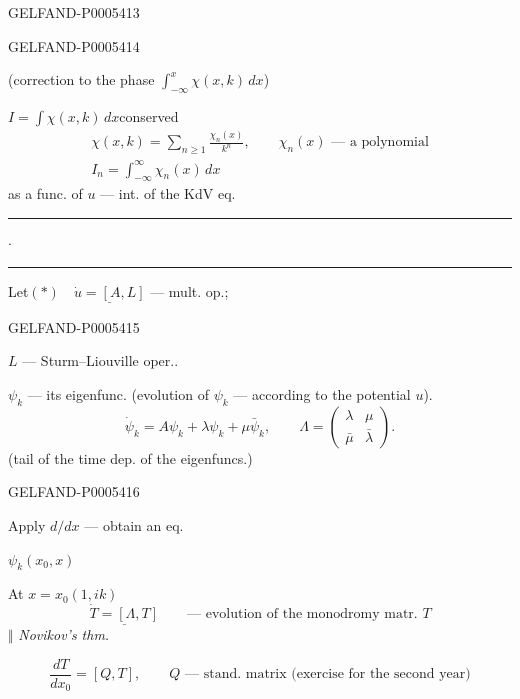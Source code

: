 \begin{GelfandAdjacentEvidence}{GELFAND-P000541}{3}

\end{GelfandAdjacentEvidence}
\begin{GelfandAdjacentEvidence}{GELFAND-P000541}{4}

(correction to the phase \(\int_{-\infty}^{x}\chi(x,k)\,dx\))

\(I=\int\chi(x,k)\,dx\)\quad conserved
\begin{gather*}
\chi(x,k)=\sum_{n\ge1}\frac{\chi_n(x)}{k^n},
\qquad \chi_n(x)\text{ — a polynomial}\\
I_n=\int_{-\infty}^{\infty}\chi_n(x)\,dx
\end{gather*}
as a func. of \(u\) — int. of the KdV eq.
\hfill\rule{1.60cm}{.35pt}\enspace\(\cdot\)\enspace\rule{1.60cm}{.35pt}\par

Let\quad \((*)\quad\underline{\dot u=[A,L]}\) — mult. op.;
\end{GelfandAdjacentEvidence}
\begin{GelfandAdjacentEvidence}{GELFAND-P000541}{5}

\(L\) — Sturm–Liouville oper..

\(\psi_k\) — its eigenfunc. (evolution of \(\psi_k\) — according to the potential \(u\)).
\[
\dot\psi_k=A\psi_k+\lambda\psi_k+\mu\bar\psi_k,\qquad
\Lambda=\begin{pmatrix}\lambda&\mu\\\bar\mu&\bar\lambda\end{pmatrix}.
\]
(tail of the time dep. of the eigenfuncs.)
\end{GelfandAdjacentEvidence}
\begin{GelfandAdjacentEvidence}{GELFAND-P000541}{6}


Apply \(d/dx\) — obtain an eq.

\(\psi_k(x_0,x)\)

At \(x=x_0\)\quad \((1,ik)\)
\[
\underline{\dot T=[\Lambda,T]}\qquad\text{— evolution of the monodromy matr. }T
\]
\hfill\(\Vert\) \textit{Novikov’s thm.}\par
\[
\frac{dT}{dx_0}=[Q,T],\qquad Q\text{ — stand. matrix (exercise for the second year)}
\]
\end{GelfandAdjacentEvidence}
